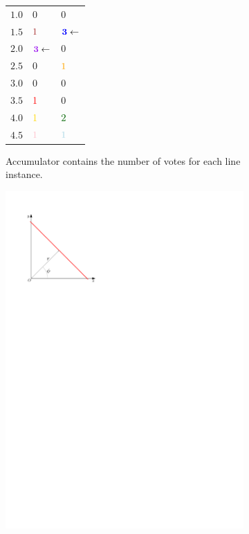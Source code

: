 \begin{figure}
\begin{subfigure}[b]{0.3\linewidth}
\begin{minipage}[c]{0.45\textwidth}
\begin{tabular}{r|ll}
				$1.0$ & $0$ & $0$\\
				$1.5$ & $\color[rgb]{0.647,0.165,0.165}{1}$ & $\mathbf{\color[rgb]{0,0,1}{3}}\leftarrow$ \\
				$2.0$ & $\mathbf{\color[rgb]{0.627,0.125,0.941}{3}}\leftarrow$& $0$\\
				$2.5$ & $0$ & $\color[rgb]{1,0.647,0}{1}$\\
				$3.0$ & $0$ & $0$\\
				$3.5$ & $\color[rgb]{1,0,0}{1}$ & $0$ \\
				$4.0$ & $\color[rgb]{1,0.843,0}{1}$ & $\color[rgb]{0,0.392,0}{2}$\\
				$4.5$ & $\color[rgb]{1,0.753,0.796}{1}$ & $\color[rgb]{0.678,0.847,0.902}{1}$\\
			\end{tabular}
			\hspace{1cm}
		\end{minipage}
		\caption{Accumulator contains the number of votes for each line instance.}\label{fig:hough-transform:d}
	\end{subfigure}
	\qquad
	\begin{subfigure}[b]{0.3\linewidth}
		\centering
		\includegraphics[width=\textwidth,page=4]{hough-transform.pdf}

\end{subfigure}
\end{figure}
